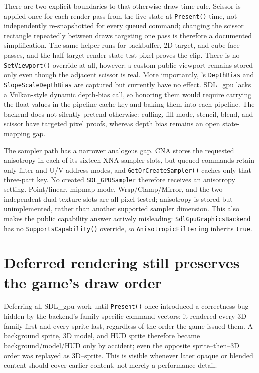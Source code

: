 There are two explicit boundaries to that otherwise draw-time rule. Scissor is applied once for
each render pass from the live state at \texttt{Present()}-time, not independently re-snapshotted
for every queued command; changing the scissor rectangle repeatedly between draws targeting one
pass is therefore a documented simplification. The same helper runs for backbuffer, 2D-target,
and cube-face passes, and the half-target render-state test pixel-proves the clip. There is no
\texttt{SetViewport()} override at all, however: a custom public viewport remains stored-only
even though the adjacent scissor is real. More importantly, 's
\texttt{DepthBias} and \texttt{SlopeScaleDepthBias} are captured but currently have no effect.
SDL\_gpu lacks a Vulkan-style dynamic depth-bias call, so honoring them would require carrying
the float values in the pipeline-cache key and baking them into each pipeline. The backend does
not silently pretend otherwise: culling, fill mode, stencil, blend, and scissor have targeted
pixel proofs, whereas depth bias remains an open state-mapping gap.

The sampler path has a narrower analogous gap. CNA stores the requested anisotropy in each of
its sixteen XNA sampler slots, but queued commands retain only
filter and U/V address modes, and \texttt{GetOrCreateSampler()} caches only that three-part key.
No created \texttt{SDL\_GPUSampler} therefore receives an anisotropy setting. Point/linear,
mipmap mode, Wrap/Clamp/Mirror, and the two independent dual-texture slots are
all pixel-tested; anisotropy is stored but unimplemented, rather than another supported sampler
dimension. This also makes the public capability answer actively misleading:
\texttt{SdlGpuGraphicsBackend} has no \texttt{SupportsCapability()} override, so
\texttt{AnisotropicFiltering} inherits \texttt{true}.

\section{Deferred rendering still preserves the game's draw order}

Deferring all SDL\_gpu work until \texttt{Present()} once introduced a correctness bug hidden by
the backend's family-specific command vectors: it rendered every 3D family first and every sprite
last, regardless of the order the game issued them. A background sprite, 3D model, and HUD sprite
therefore became background/model/HUD only by accident; even the opposite sprite--then--3D order
was replayed as 3D--sprite. This is visible whenever later opaque or blended content should cover
earlier content, not merely a performance detail.

